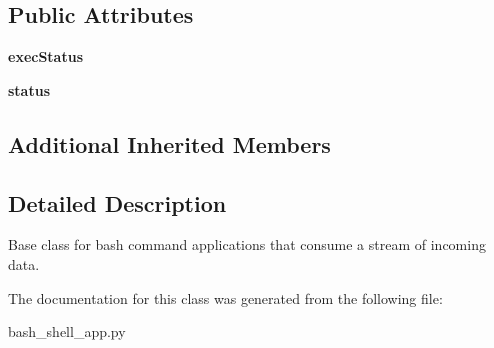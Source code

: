 \subsection*{Public Attributes}
\begin{DoxyCompactItemize}
\item 
\mbox{\label{classdlg_1_1apps_1_1bash__shell__app_1_1_streaming_input_bash_app_base_af66411c129b79bfe36920106b7598297}} 
{\bfseries exec\+Status}
\item 
\mbox{\label{classdlg_1_1apps_1_1bash__shell__app_1_1_streaming_input_bash_app_base_a535bbfaf7a406b0ceee8b62d298ad09c}} 
{\bfseries status}
\end{DoxyCompactItemize}
\subsection*{Additional Inherited Members}


\subsection{Detailed Description}
\begin{DoxyVerb}Base class for bash command applications that consume a stream of incoming
data.
\end{DoxyVerb}
 

The documentation for this class was generated from the following file\+:\begin{DoxyCompactItemize}
\item 
bash\+\_\+shell\+\_\+app.\+py\end{DoxyCompactItemize}

